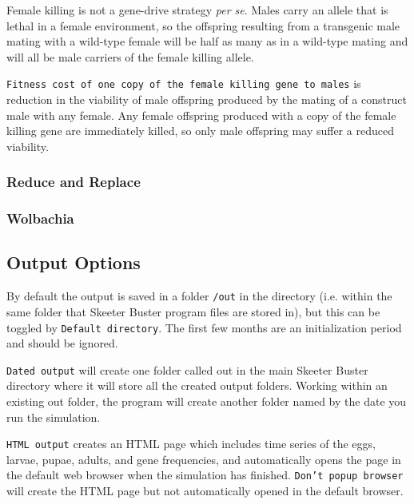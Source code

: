 \documentclass[11pt]{article}
\newcommand{\linecmd}[1]{\texttt{#1}}
\begin{document}
Female killing is not a gene-drive strategy \emph{per se}. Males carry an allele that is lethal in a female environment, so the offspring resulting from a transgenic male mating with a wild-type female will be half as many as in a wild-type mating and will all be male carriers of the female killing allele. 

\linecmd{Fitness cost of one copy of the female killing gene to males} is reduction in the viability of male offspring produced by the mating of a construct male with any female. Any female offspring produced with a copy of the female killing gene are immediately killed, so only male offspring may suffer a reduced viability.

\subsubsection{Reduce and Replace}%

\subsubsection{Wolbachia}%

\subsection{Output Options}\label{OutputOptions} %
By default the output is saved in a folder \linecmd{/out} in the directory (i.e. within the same folder that Skeeter Buster program files are stored in), but this can be toggled by \linecmd{Default directory}. The first few months are an initialization period and should be ignored.

\linecmd{Dated output} will create one folder called out in the main Skeeter Buster directory where it will store all the created output folders. Working within an existing out folder, the program will create another folder named by the date you run the simulation.

\linecmd{HTML output} creates an HTML page which includes time series of the eggs, larvae, pupae, adults, and gene frequencies, and automatically opens the page in the default web browser when the simulation has finished. \linecmd{Don't popup browser} will create the HTML page but not automatically opened in the default browser.
\end{document}

